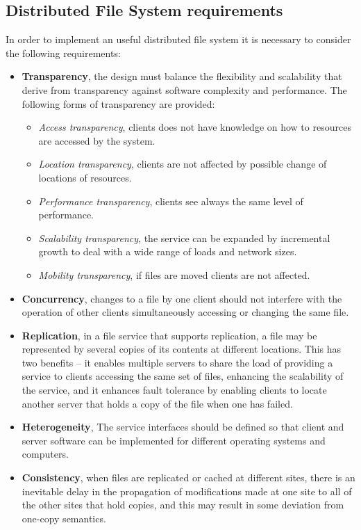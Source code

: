 \subsection{Distributed File System requirements}
In order to implement an useful distributed file system it is necessary to consider the following requirements:
\begin{itemize}
	\item \textbf{Transparency}, the design must balance the flexibility and scalability that derive from transparency against software complexity and performance. The following forms of transparency are provided:
	\begin{itemize}
		\item \textit{Access transparency}, clients does not have knowledge on how to resources are accessed by the system.
		\item \textit{Location transparency}, clients are not affected by possible change of locations of resources.
		\item \textit{Performance transparency}, clients see always the same level of performance.
		\item \textit{Scalability transparency}, the service can be expanded by incremental growth to deal with a wide range of loads and network sizes.
		\item \textit{Mobility transparency}, if files are moved clients are not affected.
	\end{itemize}
	    
	
	\item \textbf{Concurrency}, changes to a file by one client should not interfere with the operation of other clients simultaneously accessing or changing the same file.
	
	\item \textbf{Replication}, in a file service that supports replication, a file may be represented by several copies of its contents at different locations. This has two benefits – it enables multiple servers to share the load of providing a service to clients accessing the same set of files, enhancing the scalability of the service, and it enhances fault tolerance by enabling clients to locate another server that holds a copy of the file when one has failed.
	
	\item \textbf{Heterogeneity}, The service interfaces should be defined so that client and server software can be implemented for different operating systems and computers.
	
	\item \textbf{Consistency}, when files are replicated or cached at different sites, there is an inevitable delay in the propagation of modifications made at one site to all of the other sites that hold copies, and this may result in some deviation from one-copy semantics.
	

\end{itemize}
